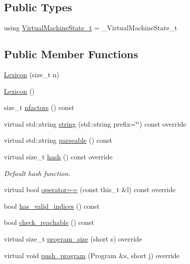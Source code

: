 \subsection*{Public Types}
\begin{DoxyCompactItemize}
\item 
using \hyperlink{class_lexicon_aad6ccf985be61e5386ea67f0f7670d65}{Virtual\+Machine\+State\+\_\+t} = \+\_\+\+Virtual\+Machine\+State\+\_\+t
\end{DoxyCompactItemize}
\subsection*{Public Member Functions}
\begin{DoxyCompactItemize}
\item 
\hyperlink{class_lexicon_a953fa0e2f69d1b72fa567a09f80ef73c}{Lexicon} (size\+\_\+t n)
\item 
\hyperlink{class_lexicon_a60ed551d9c6a52e18f1e8668b89a6fa5}{Lexicon} ()
\item 
size\+\_\+t \hyperlink{class_lexicon_af83fbb93bd5ef30a39997c855ce2b0f5}{nfactors} () const
\item 
virtual std\+::string \hyperlink{class_lexicon_a94d839ba9055b7a8e859628828939ffb}{string} (std\+::string prefix=\char`\"{}\char`\"{}) const override
\item 
virtual std\+::string \hyperlink{class_lexicon_aee7952473269abe7fc1cc0e2b96b8307}{parseable} () const
\item 
virtual size\+\_\+t \hyperlink{class_lexicon_a53dc77a82e9cb0312ef3de53f0a65b0a}{hash} () const override
\begin{DoxyCompactList}\small\item\em Default hash function. \end{DoxyCompactList}\item 
virtual bool \hyperlink{class_lexicon_a04bde89f87b53ea3b283149f159dd35f}{operator==} (const this\+\_\+t \&l) const override
\item 
bool \hyperlink{class_lexicon_aa9200d0476bd5016e7ea1f049738ed47}{has\+\_\+valid\+\_\+indices} () const
\item 
bool \hyperlink{class_lexicon_a4d2056453bb4fdd179c0e961fb071aea}{check\+\_\+reachable} () const
\item 
virtual size\+\_\+t \hyperlink{class_lexicon_a25f1c33df93b2e0722bc5c0f3b37ebcd}{program\+\_\+size} (short s) override
\item 
virtual void \hyperlink{class_lexicon_a16462025a8be6ffff655b27c84b4307d}{push\+\_\+program} (Program \&s, short j) override

\end{DoxyCompactItemize}
